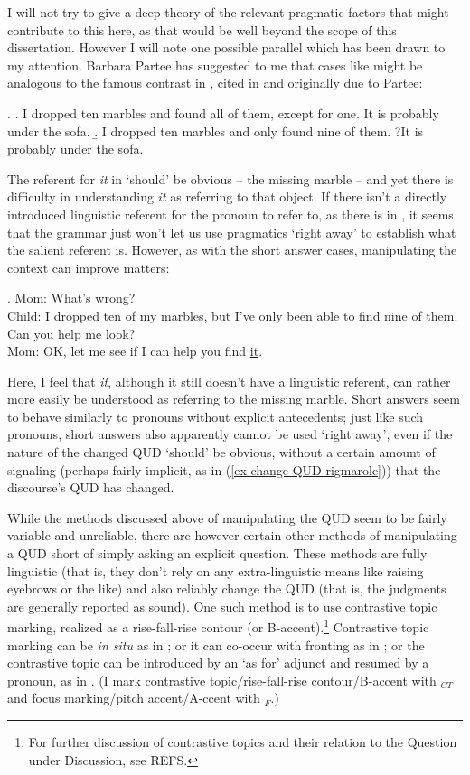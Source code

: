 \documentclass[11pt,letterpaper]{article}
\begin{document}
I will not try to give a deep theory of the relevant pragmatic factors that might contribute to this here, as that would be well beyond the scope of this dissertation.
However I will note one possible parallel which has been drawn to my attention.
Barbara Partee has suggested to me that cases like \Last might be analogous to the famous contrast in \Next, cited in \cite{Hei82} and originally due to Partee:

\ex.	\a. I dropped ten marbles and found all of them, except for one. It is probably under the sofa.
	\b. I dropped ten marbles and only found nine of them. ?It is probably under the sofa.
	
The referent for {\it it} in \Last[b] `should' be obvious -- the missing marble -- and yet there is difficulty in understanding {\it it} as referring to that object.
If there isn't a directly introduced linguistic referent for the pronoun to refer to, as there is in \Last[a], it seems that the grammar just won't let us use pragmatics `right away' to establish what the salient referent is.
However, as with the short answer cases, manipulating the context can improve matters:

\ex. 	Mom: What's wrong?\\
	Child: I dropped ten of my marbles, but I've only been able to find nine of them. Can you help me look?\\
	Mom: OK, let me see if I can help you find \underline{it}.
	
Here, I feel that {\it it}, although it still doesn't have a linguistic referent, can rather more easily be understood as referring to the missing marble.
Short answers seem to behave similarly to pronouns without explicit antecedents; just like such pronouns, short answers also apparently cannot be used `right away', even if the nature of the changed QUD `should' be obvious, without a certain amount of signaling (perhaps fairly implicit, as in (\ref{ex-change-QUD-rigmarole})) that the discourse's QUD has changed.

While the methods discussed above of manipulating the QUD seem to be fairly variable and unreliable, there are however certain other methods of manipulating a QUD short of simply asking an explicit question.
These methods are fully linguistic (that is, they don't rely on any extra-linguistic means like raising eyebrows or the like) and also reliably change the QUD (that is, the judgments are generally reported as sound).
One such method is to use contrastive topic marking, realized as a rise-fall-rise contour (or B-accent).\footnote{For further discussion of contrastive topics and their relation to the Question under Discussion, see REFS.} %
Contrastive topic marking can be {\it in situ} as in \Next[a]; or it can co-occur with fronting as in \Next[b]; or the contrastive topic can be introduced by an `as for' adjunct and resumed by a pronoun, as in \Next[c]. (I mark contrastive topic/rise-fall-rise contour/B-accent with $_{CT}$ and focus marking/pitch accent/A-ccent with $_{F}$.)
\end{document}
